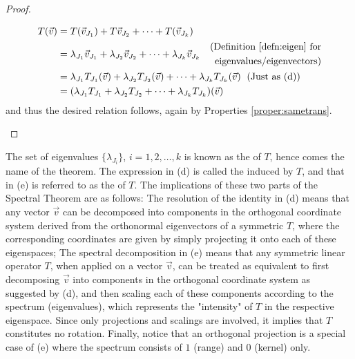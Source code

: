 \begin{proof}
\begin{enumerate}[label=(\alph*)]
\begin{align*}
T(\vec{v}) &= T(\vec{v}_{J_1}) + T\vec{v}_{J_2} + \cdots + T(\vec{v}_{J_k}) \\
&= \lambda_{J_1}\vec{v}_{J_1} + \lambda_{J_2}\vec{v}_{J_2} + \cdots + \lambda_{J_k}\vec{v}_{J_k} \quad \begin{aligned}
\text{(Definition \ref{defn:eigen} for} \\
\text{eigenvalues/eigenvectors)}
\end{aligned} \\
&= \lambda_{J_1}T_{J_1}(\vec{v}) + \lambda_{J_2}T_{J_2}(\vec{v}) + \cdots + \lambda_{J_k}T_{J_k}(\vec{v}) \text{\; (Just as (d))} \\
&= (\lambda_{J_1}T_{J_1} + \lambda_{J_2}T_{J_2} + \cdots + \lambda_{J_k}T_{J_k})(\vec{v})
\end{align*}
and thus the desired relation follows, again by Properties \ref{proper:sametrans}.
\end{enumerate}
\end{proof}
The set of eigenvalues $\{\lambda_{J_i}\}$, $i = 1,2,\ldots,k$ is known as the  of $T$, hence comes the name of the theorem. The expression in (d) is called the  induced by $T$, and that in (e) is referred to as the  of $T$. The implications of these two parts of the Spectral Theorem are as follows: The resolution of the identity in (d) means that any vector $\vec{v}$ can be decomposed into components in the orthogonal coordinate system derived from the orthonormal eigenvectors of a symmetric $T$, where the corresponding coordinates are given by simply projecting it onto each of these eigenspaces; The spectral decomposition in (e) means that any symmetric linear operator $T$, when applied on a vector $\vec{v}$, can be treated as equivalent to first decomposing $\vec{v}$ into components in the orthogonal coordinate system as suggested by (d), and then scaling each of these components according to the spectrum (eigenvalues), which represents the "intensity" of $T$ in the respective eigenspace. Since only projections and scalings are involved, it implies that $T$ constitutes no rotation. Finally, notice that an orthogonal projection is a special case of (e) where the spectrum consists of $1$ (range) and $0$ (kernel) only.\par
